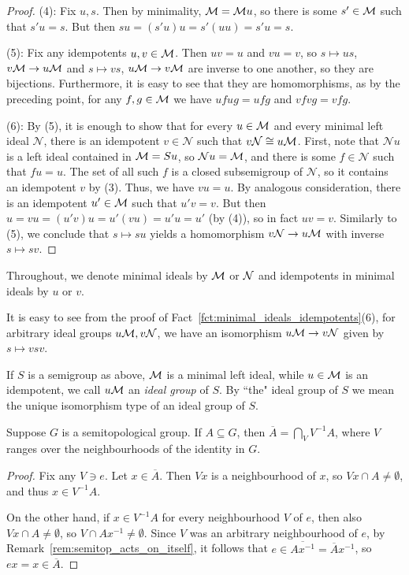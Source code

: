 \begin{proof}
		(4): Fix $u,s$. Then by minimality, ${\mathcal M}={\mathcal M} u$, so there is some $s'\in {\mathcal M}$ such that $s'u=s$. But then $su=(s'u)u=s'(uu)=s'u=s$.
		
		(5): Fix any idempotents $u,v\in {\mathcal M}$. Then $uv=u$ and $vu=v$, so $s\mapsto us$, $v{\mathcal M}\to u{\mathcal M}$ and $s\mapsto vs$, $u{\mathcal M}\to v{\mathcal M}$ are inverse to one another, so they are bijections. Furthermore, it is easy to see that they are homomorphisms, as by the preceding point, for any $f,g\in {\mathcal M}$ we have $ufug=ufg$ and $vfvg=vfg$.
		
		(6): By (5), it is enough to show that for every $u\in {\mathcal M}$ and every minimal left ideal $\mathcal N$, there is an idempotent $v\in \mathcal N$ such that $v\mathcal N\cong u{\mathcal M}$. First, note that $\mathcal N u$ is a left ideal contained in ${\mathcal M}=Su$, so $\mathcal N u={\mathcal M}$, and there is some $f\in \mathcal N$ such that $fu=u$. The set of all such $f$ is a closed subsemigroup of $\mathcal N$, so it contains an idempotent $v$ by (3). Thus, we have $vu=u$. By analogous consideration, there is an idempotent $u'\in {\mathcal M}$ such that $u'v=v$. But then $u=vu=(u'v)u=u'(vu)=u'u=u'$ (by (4)), so in fact $uv=v$. Similarly to (5), we conclude that $s\mapsto su$ yields a homomorphism $v\mathcal N\to u{\mathcal M}$ with inverse $s\mapsto sv$.
	\end{proof}
	Throughout, we denote minimal ideals by ${\mathcal M}$ or ${\mathcal N}$ and idempotents in minimal ideals by $u$ or $v$.
	
	\begin{rem}
		\label{rem:explicit_ellisgroup_isomorphism}
		It is easy to see from the proof of Fact~\ref{fct:minimal_ideals_idempotents}(6), for arbitrary ideal groups $u{\mathcal M},v{\mathcal N}$, we have an isomorphism $u{\mathcal M}\to v\mathcal N$ given by $s\mapsto vsv$.\xqed{\lozenge}
	\end{rem}
	
	\begin{dfn}
		If $S$ is a semigroup as above, ${\mathcal M}$ is a minimal left ideal, while $u\in {\mathcal M}$ is an idempotent, we call $u{\mathcal M}$ an \emph{ideal group} of $S$. By ``the" ideal group of $S$ we mean the unique isomorphism type of an ideal group of $S$.
		\xqed{\lozenge}
	\end{dfn}
	
	
	\begin{fct}
		Suppose $G$ is a semitopological group. If $A\subseteq G$, then $\overline{A}=\bigcap_V V^{-1}A$, where $V$ ranges over the neighbourhoods of the identity in $G$.
	\end{fct}
	\begin{proof}
		Fix any $V\ni e$. Let $x\in \overline{A}$. Then $Vx$ is a neighbourhood of $x$, so $Vx\cap A\neq \emptyset$, and thus $x\in V^{-1}A$.
		
		On the other hand, if $x\in V^{-1}A$ for every neighbourhood $V$ of $e$, then also $Vx\cap A\neq\emptyset$, so $V\cap Ax^{-1}\neq\emptyset$. Since $V$ was an arbitrary neighbourhood of $e$, by Remark~\ref{rem:semitop_acts_on_itself}, it follows that $e\in \overline{Ax^{-1}}=\overline{A} x^{-1}$, so $ex=x\in \overline{A}$.
	\end{proof}
	
